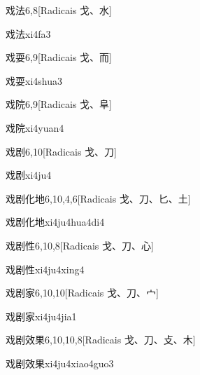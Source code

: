 \begin{entry}{戏法}{6,8}[Radicais ⼽、⽔]
  \begin{phonetics}{戏法}{xi4fa3}
  \end{phonetics}
\end{entry}

\begin{entry}{戏耍}{6,9}[Radicais ⼽、⽽]
  \begin{phonetics}{戏耍}{xi4shua3}
  \end{phonetics}
\end{entry}

\begin{entry}{戏院}{6,9}[Radicais ⼽、⾩]
  \begin{phonetics}{戏院}{xi4yuan4}
  \end{phonetics}
\end{entry}

\begin{entry}{戏剧}{6,10}[Radicais ⼽、⼑]
  \begin{phonetics}{戏剧}{xi4ju4}
  \end{phonetics}
\end{entry}

\begin{entry}{戏剧化地}{6,10,4,6}[Radicais ⼽、⼑、⼔、⼟]
  \begin{phonetics}{戏剧化地}{xi4ju4hua4di4}
  \end{phonetics}
\end{entry}

\begin{entry}{戏剧性}{6,10,8}[Radicais ⼽、⼑、⼼]
  \begin{phonetics}{戏剧性}{xi4ju4xing4}
  \end{phonetics}
\end{entry}

\begin{entry}{戏剧家}{6,10,10}[Radicais ⼽、⼑、⼧]
  \begin{phonetics}{戏剧家}{xi4ju4jia1}
  \end{phonetics}
\end{entry}

\begin{entry}{戏剧效果}{6,10,10,8}[Radicais ⼽、⼑、⽁、⽊]
  \begin{phonetics}{戏剧效果}{xi4ju4xiao4guo3}
  \end{phonetics}
\end{entry}

